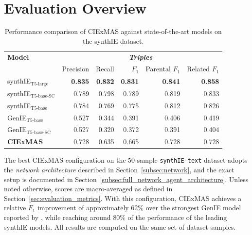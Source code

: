 \documentclass[a4paper,oneside,bibliography=totoc]{scrbook}
\begin{document}
\section{Evaluation Overview}
\label{sec:evaluation_overview}

\begin{table}[h]
  \centering
  \begin{tabular}{l|rrrrr}
    \toprule
    \textbf{Model}                & \multicolumn{5}{c}{\textit{\textbf{Triples}}}                                                                     \\
                                  & Precision                                     & Recall         & $F_1$          & Parental $F_1$ & Related $F_1$  \\
    \midrule
    synthIE$_{\text{T5-large}}$   & \textbf{0.835}                                & \textbf{0.832} & \textbf{0.831} & \textbf{0.841} & \textbf{0.858} \\
    synthIE$_{\text{T5-base-SC}}$ & 0.789                                         & 0.798          & 0.789          & 0.819          & 0.833          \\
    synthIE$_{\text{T5-base}}$    & 0.784                                         & 0.769          & 0.775          & 0.812          & 0.826          \\
    GenIE$_{\text{T5-base}}$      & 0.527                                         & 0.344          & 0.391          & 0.406          & 0.419          \\
    GenIE$_{\text{T5-base-SC}}$   & 0.527                                         & 0.320          & 0.372          & 0.391          & 0.404          \\
    \midrule
    \textbf{CIExMAS}              & 0.728                                         & 0.635          & 0.665          & 0.728          & 0.728          \\
    \bottomrule
  \end{tabular}
  \caption{Performance comparison of CIExMAS against state-of-the-art models on the synthIE dataset.}
  \label{tab:evaluation_overview}
\end{table}

The best CIExMAS configuration on the 50-sample \texttt{synthIE-text} dataset adopts the \textit{network architecture} described in Section~\ref{subsec:network}, and the exact setup is documented in Section~\ref{subsec:full_network_agent_architecture}. Unless noted otherwise, scores are macro-averaged as defined in Section~\ref{sec:evaluation_metrics}. With this configuration, CIExMAS achieves a relative $F_1$ improvement of approximately 62\% over the strongest GenIE model reported by \citet{Josifoski2021}, while reaching around 80\% of the performance of the leading synthIE models. All results are computed on the same set of dataset samples.
\end{document}
